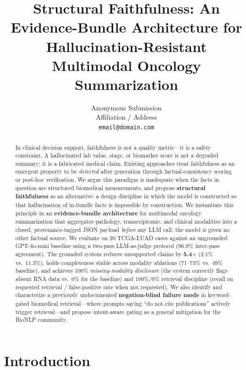 \documentclass[11pt]{article}
\title{Structural Faithfulness: An Evidence-Bundle Architecture for Hallucination-Resistant Multimodal Oncology Summarization}
\author{
Anonymous Submission\\
Affiliation / Address\\
\texttt{email@domain.com}
}
\begin{document}
\maketitle
\begin{abstract}

In clinical decision support, faithfulness is not a quality metric—it is a safety constraint. A hallucinated lab value, stage, or biomarker score is not a degraded summary; it is a fabricated medical claim. Existing approaches treat faithfulness as an emergent property to be \emph{detected} after generation through factual-consistency scoring or post-hoc verification. We argue this paradigm is inadequate when the facts in question are structured biomedical measurements, and propose \textbf{structural faithfulness} as an alternative: a design discipline in which the model is constructed so that hallucination of in-bundle facts is impossible by construction. We instantiate this principle in an \textbf{evidence-bundle architecture} for multimodal oncology summarization that aggregates pathology, transcriptomic, and clinical modalities into a closed, provenance-tagged JSON payload \emph{before} any LLM call; the model is given no other factual source. We evaluate on 20 TCGA-LUAD cases against an ungrounded GPT-4o-mini baseline using a two-pass LLM-as-judge protocol (96.9\% inter-pass agreement). The grounded system reduces unsupported claims by \textbf{5.4$\times$} (2.1\% vs.\ 11.3\%), holds completeness stable across modality ablations (71--73\% vs.\ 49\% baseline), and achieves 100\% \emph{missing-modality disclosure} (the system correctly flags absent RNA data vs.\ 0\% for the baseline) and 100\%/0\% retrieval discipline (recall on requested retrieval / false-positive rate when not requested). We also identify and characterize a previously undocumented \textbf{negation-blind failure mode} in keyword-gated biomedical retrieval—where prompts saying ``do not cite publications'' actively trigger retrieval—and propose intent-aware gating as a general mitigation for the BioNLP community.

\end{abstract}

\section{Introduction}
\end{document}
